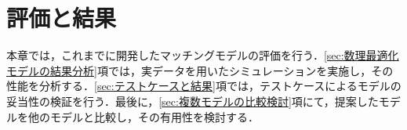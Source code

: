 \section{評価と結果}
  \label{sec:評価と結果}
    \par
  
      \par 本章では，これまでに開発したマッチングモデルの評価を行う．\ref{sec:数理最適化モデルの結果分析}項では，実データを用いたシミュレーションを実施し，その性能を分析する．\ref{sec:テストケースと結果}項では，テストケースによるモデルの妥当性の検証を行う．最後に，\ref{sec:複数モデルの比較検討}項にて，提案したモデルを他のモデルと比較し，その有用性を検討する．
  

